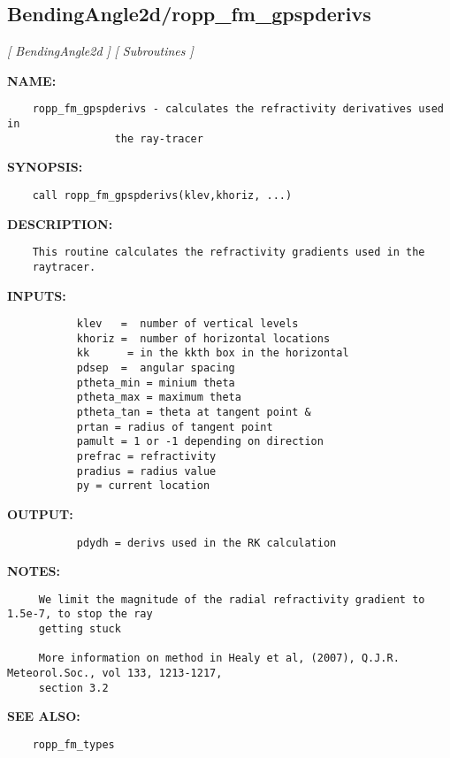 \subsection{BendingAngle2d/ropp\_fm\_gpspderivs}
\textsl{[ BendingAngle2d ]}
\textsl{[ Subroutines ]}

\label{ch:robo13}
\label{ch:BendingAngle2d_ropp_fm_gpspderivs}
\textbf{NAME:}\hspace{0.08in}\begin{Verbatim}
    ropp_fm_gpspderivs - calculates the refractivity derivatives used in
                 the ray-tracer 
\end{Verbatim}
\textbf{SYNOPSIS:}\hspace{0.08in}\begin{Verbatim}
    call ropp_fm_gpspderivs(klev,khoriz, ...)
\end{Verbatim}
\textbf{DESCRIPTION:}\hspace{0.08in}\begin{Verbatim}
    This routine calculates the refractivity gradients used in the
    raytracer.  
\end{Verbatim}
\textbf{INPUTS:}\hspace{0.08in}\begin{Verbatim}
           klev   =  number of vertical levels
           khoriz =  number of horizontal locations
           kk      = in the kkth box in the horizontal
           pdsep  =  angular spacing
           ptheta_min = minium theta 
           ptheta_max = maximum theta 
           ptheta_tan = theta at tangent point & 
           prtan = radius of tangent point
           pamult = 1 or -1 depending on direction
           prefrac = refractivity
           pradius = radius value
           py = current location
\end{Verbatim}
\textbf{OUTPUT:}\hspace{0.08in}\begin{Verbatim}
           pdydh = derivs used in the RK calculation
\end{Verbatim}
\textbf{NOTES:}\hspace{0.08in}\begin{Verbatim}
     We limit the magnitude of the radial refractivity gradient to 1.5e-7, to stop the ray
     getting stuck 

     More information on method in Healy et al, (2007), Q.J.R. Meteorol.Soc., vol 133, 1213-1217, 
     section 3.2  
\end{Verbatim}
\textbf{SEE ALSO:}\hspace{0.08in}\begin{Verbatim}
    ropp_fm_types
\end{Verbatim}
